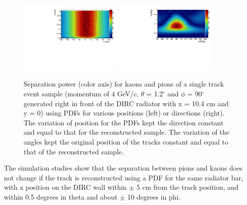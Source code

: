 \begin{figure}[!h]
\centering
\includegraphics[clip, trim=0.4cm 0.4cm 0.4cm 0.4cm, width=0.45\textwidth]{pics/xy_scan.pdf} \hspace{0.5cm} \includegraphics[clip, trim=0.4cm 0.4cm 0.4cm 0.4cm, width=0.45\textwidth]{pics/th_phi_scan.pdf}
\caption{\label{pic:simPDF}
Separation power (color axis) for kaons and pions of a single track event sample (momentum of 4 GeV/$c$, $\theta$ = 1.2$^{\circ}$ and $\phi$ = 90$^{\circ}$ generated right in front of the DIRC radiator with x = 10.4 cm and y = 0) using PDFs for various positions (left) or directions (right). The variation of position for the PDFs kept the direction constant and equal to that for the reconstructed sample. The variation of the angles kept the original position of the tracks constant and equal to that of the reconstructed sample.
}
\end{figure}

The simulation studies show that the separation between pions and kaons does not change if the track is reconstructed using a PDF for the same radiator bar, with x position on the DIRC wall within $\pm$ 5 cm from the track position, and within 0.5 degrees in theta and about $\pm$ 10 degrees in phi.

